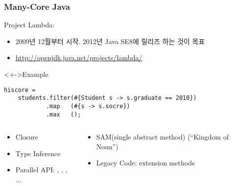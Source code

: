 \begin{frame}[fragile]
\frametitle{Many-Core Java}

Project Lambda: 
\begin{itemize}
\item 2009년 12월부터 시작. 2012년 Java SE8에 릴리즈 하는 것이 목표
\item \url{http://openjdk.java.net/projects/lambda/}
\end{itemize}

\lstset{language=Java,basicstyle=\ttfamily\small}
\begin{block}<+->{Example}
\begin{lstlisting}
hiscore = 
    students.filter(#{Student s -> s.graduate == 2010})
            .map   (#{s -> s.socre}) 
            .max   ();
\end{lstlisting}
\end{block}

\begin{columns}[t]
    \begin{column}{0.5\textwidth}
        \begin{itemize}
        \item Closure
        \item Type Inference
        \item Parallel API: , , , ...
        \end{itemize}
    \end{column}

    \begin{column}{0.5\textwidth}
        \begin{itemize}
        \item SAM(single abstract method) (``Kingdom of Noun'')
        \item Legacy Code: extension methods
        \end{itemize}
    \end{column}
\end{columns}


\end{frame}
